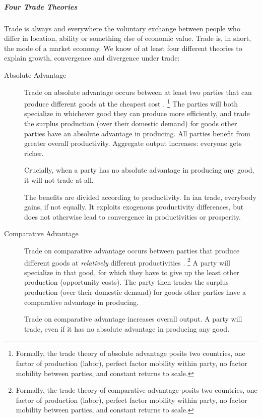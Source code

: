 \subparagraph{Four Trade Theories}
	\label{sec:trade-theories}
Trade is always and everywhere the voluntary exchange between people who differ in location, ability or something else of economic value.
Trade is, in short, the mode of a market economy.
We know of at least four different theories to explain growth, convergence and divergence under trade:

\begin{description}
	\item[Absolute Advantage]
	\label{itm:absolute-advantage}
	Trade on absolute advantage occurs between at least two parties that can produce different goods at the cheapest cost \citep{Smith-1776-lq}.
	\footnote{
		Formally, the trade theory of absolute advantage posits two countries, one factor of production (labor), perfect factor mobility within party, no factor mobility between parties, and constant returns to scale.
	}
	The parties will both specialize in whichever good they can produce more efficiently, and trade the surplus production (over their domestic demand) for goods other parties have an absolute advantage in producing.
	All parties benefit from greater overall productivity.
	Aggregate output increases:
	everyone gets richer.

	Crucially, when a party has no absolute advantage in producing any good, it will not trade at all.

	The benefits are divided according to productivity.
	In \citeauthor{Smith-1776-lq}ian trade, everybody gains, if not equally.
	It exploits exogenous productivity differences, but does not otherwise lead to convergence in productivities or prosperity.

	\item[Comparative Advantage]
	\label{itm:comparative-advantage}
	Trade on comparative advantage occurs between parties that produce different goods at \emph{relatively} different productivities \citep{Ricardo1817}.
	\footnote{
		Formally, the trade theory of comparative advantage posits two countries, one factor of production (labor), perfect factor mobility within party, no factor mobility between parties, and constant returns to scale.
	}
	A party will specialize in that good, for which they have to give up the least other production (opportunity costs).
	The party then trades the surplus production (over their domestic demand) for goods other parties have a comparative advantage in producing.

	Trade on comparative advantage increases overall output.
	A party will trade, even if it has no absolute advantage in producing any good.


\end{description}
